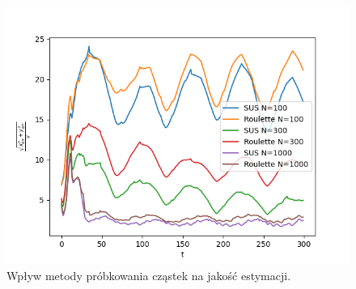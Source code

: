 \begin{figure}[H]
	\begin{center}
		\includegraphics[width=12cm]{./sampling_impact.png}
		\caption{Wpływ metody próbkowania cząstek na jakość estymacji.}
		\label{sampling_impact}
	\end{center}
\end{figure}


